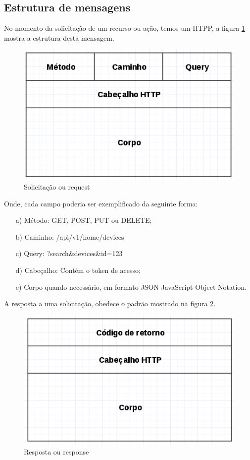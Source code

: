 \subsection{Estrutura de mensagens}
No momento da solicitação de um recurso ou ação, temos um HTPP, a figura \ref{request} mostra a estrutura desta mensagem.

\begin{figure}[H]
\caption{\label{request} Solicitação ou request}
\includegraphics[scale=0.5]{img/api-request.png}
\end{figure}

Onde, cada campo poderia ser exemplificado da seguinte forma:

\begin{itemize}
    \item [a)] Método: GET, POST, PUT ou DELETE;
    \item [b)] Caminho: /api/v1/home/devices
    \item [c)] Query: ?search\&devices\&id=123
    \item [d)] Cabeçalho: Contém o token de acesso;
    \item [e)] Corpo quando necessário, em formato JSON JavaScript Object Notation.
\end{itemize}

A resposta a uma solicitação, obedece o padrão mostrado na figura \ref{response}.

\begin{figure}[H]
\caption{\label{response} Resposta ou response}
\includegraphics[scale=0.5]{img/api-response.png}
\end{figure}

